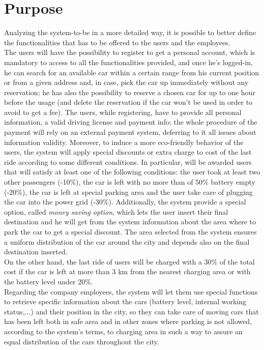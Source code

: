 \documentclass[11pt,a4paper]{report}
\begin{document}
\section{Purpose}
Analyzing the system-to-be in a more detailed way, it is possible to better define the functionalities that has to be offered to the users and the employees.\\
The users will have the possibility to register to get a personal account, which is mandatory to access to all the functionalities provided, and once he's logged-in, he can search for an available car within a certain range from his current position or from a given address and, in case, pick the car up immediately without any reservation; he has also the possibility to reserve a chosen car for up to one hour before the usage (and delete the reservation if the car won't be used in order to avoid to get a fee). The users, while registering, have to provide all personal information, a valid driving license and payment info; the whole procedure of the payment will rely on an external payment system, deferring to it all issues about information validity.
Moreover, to induce a more eco-friendly behavior of the users, the system will apply special discounts or extra charge to cost of the last ride according to some different conditions. In particular, will be awarded users that will satisfy at least one of the following conditions: the user took at least two other passengers (-10\%), the car is 
left with no more than of 50\% battery empty (-20\%), the car is left at special parking area and the user take care of plugging the car into the power grid (-30\%). Additionally, the system provide a special option, called \textit{money saving option}, which lets the user insert their final destination and he will get from the system information about the area where to park the car to get a special discount. The area selected from the system ensures a uniform distribution of the car around the city and depends also on the final destination inserted.\\
On the other hand, the last ride of users will be charged with a 30\% of the total cost if the car is left at more than 3 km from the nearest charging area or with the battery level under 20\%.\\
Regarding the company employees, the system will let them use special functions to retrieve specific information about the cars (battery level, internal working status,...) and their position in the city, so they can take care of moving cars that has been left both in safe area and in other zones where parking is not allowed, according to the system's terms, to charging area in such a way to assure an equal distribution of the cars throughout the city.
\end{document}
